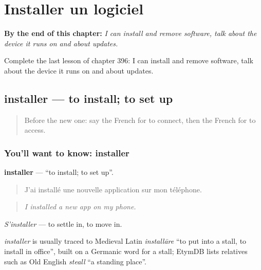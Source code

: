 
\chapter{Installer un logiciel}
\label{ch:fr-installer-un-logiciel}

\begin{chapteropening}
\textbf{By the end of this chapter:} \emph{I can install and remove software, talk about the device it runs on and about updates.}

Complete the last lesson of chapter 396: I can install and remove software, talk about the device it runs on and about updates.
\end{chapteropening}

\section[installer]{installer — to install; to set up}

\label{lesson:FR-C396-installer}



\begin{quote}
Before the new one: say the French for to connect, then the French for to access.
\end{quote}

\subsection*{You'll want to know: installer}
\textbf{installer} — \textquotedblleft{}to install; to set up\textquotedblright{}.

\begin{quote}
J'ai installé une nouvelle application sur mon téléphone.
\end{quote}

\begin{quote}
\emph{I installed a new app on my phone.}
\end{quote}

\emph{S'installer} — to settle in, to move in.

\begin{cousinweb}
\emph{installer} is usually traced to Medieval Latin \emph{installāre} \textquotedblleft{}to put into a stall, to install in office\textquotedblright{}, built on a Germanic word for a stall; EtymDB lists relatives such as Old English \emph{steall} \textquotedblleft{}a standing place\textquotedblright{}.
\end{cousinweb}


